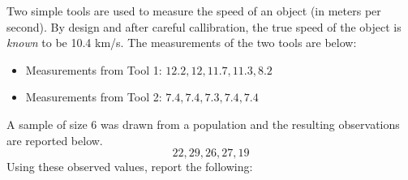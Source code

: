 \documentclass[addpoints]{examsetup}\usepackage[]{graphicx}\usepackage[]{color}
\begin{document}



\examCoverPage

\begin{questions}

\question



Two simple tools are used to measure the speed of an object (in meters per second). 
By design and after careful callibration, the true speed of the object is \textit{known} to be 10.4 km/s.
The measurements of the two tools are below: 

\begin{itemize}

   \item Measurements from Tool 1: $ 12.2, 12, 11.7, 11.3, 8.2 $ \\

   \item Measurements from Tool 2: $ 7.4, 7.4, 7.3, 7.4, 7.4 $ \\

\end{itemize}



\vspace{1cm}

\question 

A sample of size 6 was drawn from a population and the resulting observations are reported below. 
$$
   22, 29, 26, 27, 19
$$
Using these observed values, report the following:

\vspace{1cm}


\end{questions}
\end{document}
